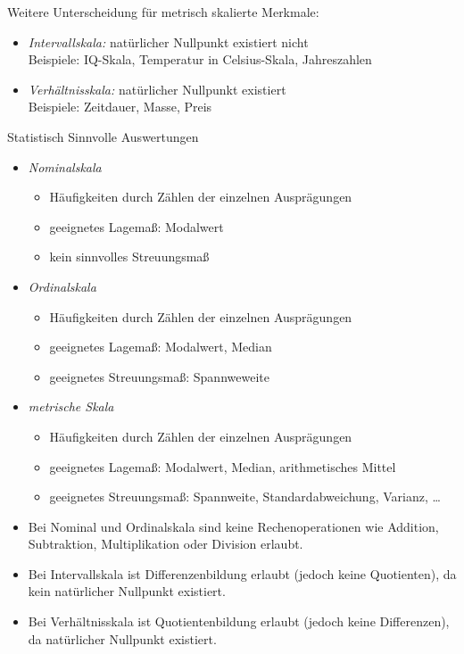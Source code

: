 \begin{enumerate}[label=(\Alph*)]
\begin{itemize}
Weitere Unterscheidung für metrisch skalierte Merkmale:
\begin{itemize}
\item \emph{Intervallskala:} natürlicher Nullpunkt existiert nicht\\
Beispiele: IQ-Skala, Temperatur in Celsius-Skala, Jahreszahlen
\item \emph{Verhältnisskala:} natürlicher Nullpunkt existiert\\
Beispiele: Zeitdauer, Masse, Preis
\end{itemize}
\end{itemize}
\end{enumerate}

 Statistisch Sinnvolle Auswertungen
\begin{itemize}
\item \emph{Nominalskala}
\begin{itemize}
\item Häufigkeiten durch Zählen der einzelnen Ausprägungen
\item geeignetes Lagemaß: Modalwert
\item kein sinnvolles Streuungsmaß
\end{itemize}
\item \emph{Ordinalskala}
\begin{itemize}
\item Häufigkeiten durch Zählen der einzelnen Ausprägungen
\item geeignetes Lagemaß: Modalwert, Median
\item geeignetes Streuungsmaß: Spannweweite
\end{itemize}
\item \emph{metrische Skala}
\begin{itemize}
\item Häufigkeiten durch Zählen der einzelnen Ausprägungen
\item geeignetes Lagemaß: Modalwert, Median, arithmetisches Mittel
\item geeignetes Streuungsmaß: Spannweite, Standardabweichung, Varianz, …
\end{itemize}
\end{itemize}

\begin{itemize}
\item Bei Nominal und Ordinalskala sind keine Rechenoperationen wie Addition, Subtraktion, Multiplikation oder Division erlaubt.
\item Bei Intervallskala ist Differenzenbildung erlaubt (jedoch keine Quotienten), da kein natürlicher Nullpunkt existiert.
\item Bei Verhältnisskala ist Quotientenbildung erlaubt (jedoch keine Differenzen), da natürlicher Nullpunkt existiert.
\end{itemize}

